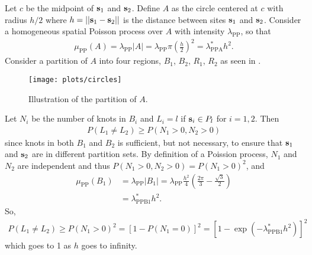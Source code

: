 Let $c$ be the midpoint of $\mathbf{s}_1$ and $\mathbf{s}_2$.
Define $A$ as the circle centered at $c$ with radius $h / 2$ where $h = ||\mathbf{s}_1 - \mathbf{s}_2||$ is the distance between sites $\mathbf{s}_1$ and $\mathbf{s}_2$.
Consider a homogeneous spatial Poisson process over $A$ with intensity $\lambda_{\mathrm{PP}}$, so that
\begin{align*}
  \mu_{\mathrm{PP}}(A) = \lambda_{\mathrm{PP}} |A| = \lambda_{\mathrm{PP}} \pi \left(\frac{h}{2}\right)^2 = \lambda_{\mathrm{PPA}}^* h^2.
\end{align*}
Consider a partition of $A$ into four regions, $B_1$, $B_2$, $R_1$, $R_2$ as seen in .
\begin{figure}
  \texttt{[image: plots/circles]}
  \caption{Illustration of the partition of $A$.}
  \label{stfig:hpp}
\end{figure}
Let $N_i$ be the number of knots in $B_i$ and $L_i = l$ if $\mathbf{s}_i \in P_l$ for $i = 1, 2$.
Then
\begin{align}
  P(L_1 \neq L_2) \ge P(N_1 > 0, N_2 > 0)
\end{align}
since knots in both $B_1$ and $B_2$ is sufficient, but not necessary, to ensure that $\mathbf{s}_1$ and $\mathbf{s}_2$ are in different partition sets.
By definition of a Poission process, $N_1$ and $N_2$ are independent and thus \mbox{$P(N_1 > 0, N_2 > 0) = P(N_1 > 0)^2$}, and
\begin{align}
  \mu_{\mathrm{PP}}(B_1) &= \lambda_{\mathrm{PP}} |B_1| = \lambda_{\mathrm{PP}} \frac{h^2}{4} \left(\frac{2 \pi}{3} - \frac{\sqrt{3}}{2} \right) \nonumber \\
       &= \lambda^*_{\mathrm{PPB1}} h^2.
\end{align}
So,
\begin{align}
  P(L_1 \neq L_2) \ge P(N_1 > 0)^2 = [1 - P(N_1 = 0)]^2 = [1 - \exp\left(-\lambda^*_{\mathrm{PPB1}} h^2\right)]^2
\end{align}
which goes to 1 as $h$ goes to infinity.


%
%


